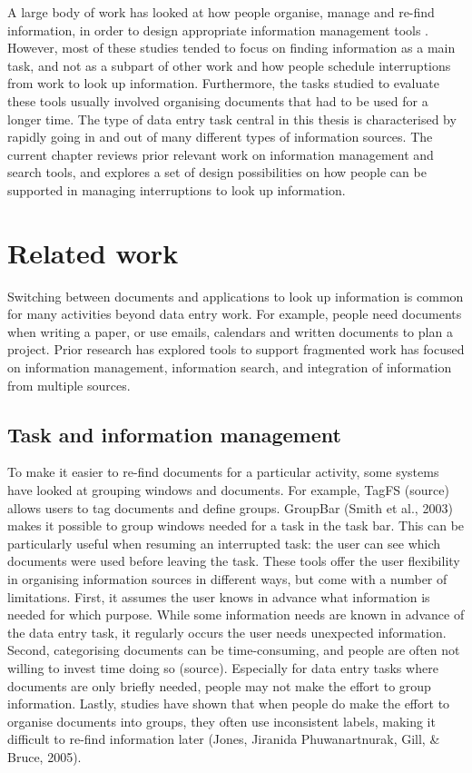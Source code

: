 A large body of work has looked at how people organise, manage and re-find information, in order to design appropriate information management tools \citep{Dumais2003, Trullemans2016}. However, most of these studies tended to focus on finding information as a main task, and not as a subpart of other work and how people schedule interruptions from work to look up information. Furthermore, the tasks studied to evaluate these tools usually involved organising documents that had to be used for a longer time. The type of data entry task central in this thesis is characterised by rapidly going in and out of many different types of information sources. The current chapter reviews prior relevant work on information management and search tools, and explores a set of design possibilities on how people can be supported in managing interruptions to look up information.

\section{Related work}
Switching between documents and applications to look up information is common for many activities beyond data entry work. For example, people need documents when writing a paper, or use emails, calendars and written documents to plan a project. Prior research has explored tools to support fragmented work has focused on information management, information search, and integration of information from multiple sources. 

\subsection{Task and information management}
To make it easier to re-find documents for a particular activity, some systems have looked at grouping windows and documents. For example, TagFS (source) allows users to tag documents and define groups. GroupBar (Smith et al., 2003) makes it possible to group windows needed for a task in the task bar. This can be particularly useful when resuming an interrupted task: the user can see which documents were used before leaving the task.
These tools offer the user flexibility in organising information sources in different ways, but come with a number of limitations. First, it assumes the user knows in advance what information is needed for which purpose. While some information needs are known in advance of the data entry task, it regularly occurs the user needs unexpected information. Second, categorising documents can be time-consuming, and people are often not willing to invest time doing so (source). Especially for data entry tasks where documents are only briefly needed, people may not make the effort to group information. Lastly, studies have shown that when people do make the effort to organise documents into groups, they often use inconsistent labels, making it difficult to re-find information later (Jones, Jiranida Phuwanartnurak, Gill, \& Bruce, 2005). 

